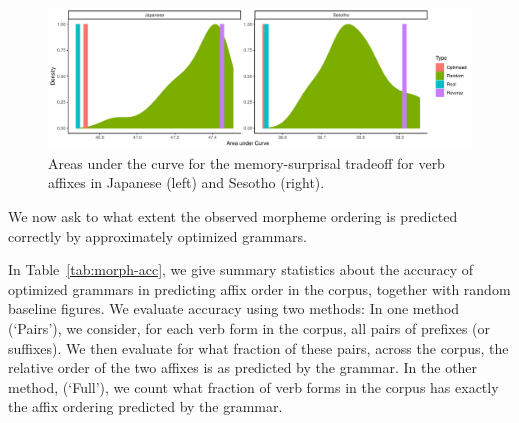 \begin{figure}
	\begin{center}
\includegraphics[width=\textwidth]{figures/Both-suffixes-byMorphemes-auc-hist-heldout.pdf}
\end{center}
	\caption{Areas under the curve for the memory-surprisal tradeoff for verb affixes in Japanese (left) and Sesotho (right). }
	\label{fig:morph-auc}
\end{figure}



%


We now ask to what extent the observed morpheme ordering is predicted correctly by approximately optimized grammars.

In Table~\ref{tab:morph-acc}, we give summary statistics about the accuracy of optimized grammars in predicting affix order in the corpus, together with random baseline figures.
We evaluate accuracy using two methods:
In one method (`Pairs'), we consider, for each verb form in the corpus, all pairs of prefixes (or suffixes).
We then evaluate for what fraction of these pairs, across the corpus, the relative order of the two affixes is as predicted by the grammar.
In the other method, (`Full'), we count what fraction of verb forms in the corpus has exactly the affix ordering predicted by the grammar.

